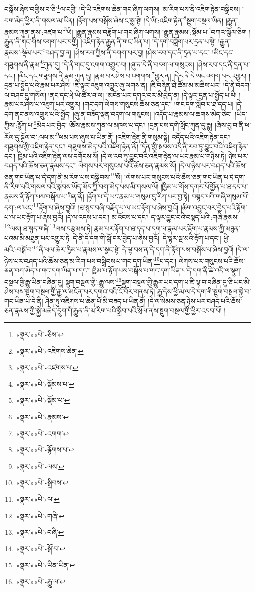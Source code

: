 བསྒོས་ཞེས་བགྱིས་བ་ཅི་\footnote{«སྣར་»«པེ་»ཅིས་}ལ་བགྱི། །དེ་ཡི་འཇིགས་ཆེན་གང་ཞིག་ལགས། །མ་རིག་པས་ནི་འཇིག་རྟེན་བསྒྲིབས། །བག་མེད་ཕྱིར་ནི་གསལ་མ་ཡིན། །རྟོག་པས་བསྒོས་ཞེས་ང་སྨྲ་སྟེ། །དེ་ཡི་:འཇིག་རྟེན་\footnote{«སྣར་»«པེ་»འཇིགས་ཆེན་}སྡུག་བསྔལ་ཡིན། །རྒྱུན་རྣམས་ཀུན་ནས་:འཛག་པ་\footnote{«སྣར་»«པེ་»འཛགས་པ་}ཡི། །རྒྱུན་རྣམས་བཟློག་པ་གང་ཞིག་ལགས། །རྒྱུན་རྣམས་:སྡོམ་པ་\footnote{«སྣར་»«པེ་»སྡོམས་པ་}བཀའ་སྩོལ་ཅིག །རྒྱུན་ནི་གང་གིས་དགག་པར་བགྱི། །འཇིག་རྟེན་རྒྱུན་ནི་གང་ཡིན་པ། །དེ་དག་བཟློག་པར་དྲན་པ་སྟེ། །རྒྱུན་རྣམས་:སྡོམ་པར་\footnote{«སྣར་»«པེ་»སྡོམ་པ་}བཤད་བྱ་ན། །ཤེས་རབ་ཀྱིས་ནི་དགག་པར་བྱ། །ཤེས་རབ་དང་ནི་དྲན་པ་དང་། །མིང་དང་གཟུགས་ནི་རྣམ་\footnote{«སྣར་»«པེ་»རྣམས་}ཀུན་དུ། །དེ་ནི་གང་དུ་འགག་འགྱུར་བ། །ཞུ་ན་དེ་ནི་བདག་ལ་གསུངས། །ཤེས་རབ་དང་ནི་དྲན་པ་དང་། །མིང་དང་གཟུགས་ནི་རྣམ་ཀུན་དུ། །རྣམ་པར་ཤེས་པ་འགགས་\footnote{«སྣར་»«པེ་»འགག་}གྱུར་ན། །དེར་ནི་དེ་ཡང་འགག་པར་འགྱུར། །དྲན་པ་སྤྱོད་པའི་རྣམ་པར་ཤེས། །ཇི་ལྟར་འཇུག་འགྱུར་ཞུ་ལགས་ན། །ཇི་བཞིན་ཐེ་ཚོམ་མ་མཆིས་པར། །དེ་ནི་བདག་ལ་བཤད་དུ་གསོལ། །ནང་དང་ཕྱི་ཡི་ཚོར་བ་ལ། །མངོན་པར་དགའ་བར་མི་བྱེད་ན། །དེ་ལྟར་དྲན་པ་སྤྱོད་པ་ཡི། །རྣམ་པར་ཤེས་པ་འཇུག་པར་འགྱུར། །གང་དག་ལེགས་གསུངས་ཆོས་ཅན་དང་། །གང་དག་སློབ་པ་ཐ་དད་པ། །དེ་དག་ནང་ནས་འགྲུས་པའི་སྤྱོད། །ཞུ་ན་བཟོད་ལྡན་བདག་ལ་གསུངས། །འདོད་པ་རྣམས་ལ་ཆགས་མེད་ཅིང་། །ཡིད་ཀྱིས་:རྙོག་པ་\footnote{«སྣར་»«པེ་»རྙོགས་པ་}མེད་པར་བྱེད། །ཆོས་རྣམས་ཀུན་ལ་མཁས་པ་དང་། །དྲན་པས་དགེ་སློང་ཀུན་དུ་རྒྱུ། །ཞེས་བྱ་བ་ནི་ཕ་རོལ་དུ་སྒྲོལ་བ་:ལས་མ་\footnote{«སྣར་»«པེ་»ལས་}ཕམ་པས་ཞུས་པ་ཡིན་ནོ། །འཇིག་རྟེན་ནི་གསུམ་སྟེ། འདོད་པའི་འཇིག་རྟེན་དང་། གཟུགས་ཀྱི་འཇིག་རྟེན་དང་། གཟུགས་མེད་པའི་འཇིག་རྟེན་ནོ། །དོན་གྱི་སྐབས་འདི་ནི་རབ་ཏུ་བྱུང་བའི་འཇིག་རྟེན་དང་། ཁྱིམ་པའི་འཇིག་རྟེན་ལས་དགོངས་སོ། །དེ་ལ་རབ་ཏུ་བྱུང་བའི་འཇིག་རྟེན་ལ་ཡང་རྣམ་པ་གཉིས་ཏེ། ཉེས་པར་བཤད་པའི་ཆོས་ཅན་རྣམས་དང་། ལེགས་པར་གསུངས་པའི་ཆོས་ཅན་རྣམས་སོ། །དེ་ལ་ཉེས་པར་བཤད་པའི་ཆོས་ཅན་གང་ཡིན་པ་དེ་དག་ནི་མ་རིག་པས་བསྒྲིབས་\footnote{«སྣར་»«པེ་»སྒྲིབས་}སོ། །ལེགས་པར་གསུངས་པའི་ཆོས་ཅན་གང་ཡིན་པ་དེ་དག་ནི་རིག་པའི་གསལ་བའི་སྐབས་ཡོད་མོད་ཀྱི་བག་མེད་པས་མི་གསལ་ལོ། །ཁྱིམ་པ་གོས་དཀར་པོ་གྱོན་པ་ཐ་དད་པ་རྣམས་ནི་རྟོག་པས་བསྒོས་པ་ཡིན་ནོ། །རྟོག་པ་དེ་ཡང་རྣམ་པ་གསུམ་དུ་རིག་པར་བྱ་སྟེ། བསྙད་པའི་གཞི་གསུམ་པོ་དག་:ལ་ཡང་\footnote{«སྣར་»«པེ་»ལ་}རྟོག་པ་ཞེས་བྱའོ། །ཐ་སྙད་བཞི་བརྗོད་པ་ལ་ཡང་རྟོག་པ་ཞེས་བྱའོ། །ཚིག་འབྱུང་བར་བྱེད་པའི་རྟོག་པ་ལ་ཡང་རྟོག་པ་ཞེས་བྱའོ། །དེ་ལ་འདས་པ་དང་། མ་འོངས་པ་དང་། ད་ལྟར་བྱུང་བའི་བསྙད་པའི་:གཞི་རྣམས་\footnote{«སྣར་»«པེ་»གཞི་}ལས། ཐ་སྙད་གཞི་\footnote{«སྣར་»«པེ་»བཞི་}ལས་བརྩམས་ཏེ། རྣམ་པར་རྟོག་པ་ཐ་དད་པ་དག་ལ་རྣམ་པར་རྟོག་པ་རྣམས་ཀྱི་མཐུན་པའམ་མི་མཐུན་པར་འགྱུར་ཏེ། དེ་ནི་དེ་དག་གི་སྒོ་བར་བྱེད་པ་ཞེས་བྱའོ། །དེ་ལྟར་སྔ་མའི་རྟོག་པ་དང་། ཕྱི་མའི་:བསྒོ་བ་\footnote{«སྣར་»«པེ་»སྒོ་བ་}ནི་ཕལ་ཆེར་ཁྱིམ་པ་རྣམས་ལ་སྣང་སྟེ། དེ་ལྟ་བས་ན་དེ་དག་ནི་རྟོག་པས་བསྒོས་པ་ཞེས་བྱའོ། །དེ་ལ་ཉེས་པར་བཤད་པའི་ཆོས་ཅན་མ་རིག་པས་བསྒྲིབས་པ་གང་དག་ཡིན་\footnote{«སྣར་»«པེ་»ཡིན་ཡིན་}པ་དང་། ལེགས་པར་གསུངས་པའི་ཆོས་ཅན་བག་མེད་པ་གང་དག་ཡིན་པ་དང་། ཁྱིམ་པ་རྟོག་པས་བསྒོས་པ་གང་དག་ཡིན་པ་དེ་དག་ནི་ཚེ་འདི་ལ་སྡུག་བསྔལ་གྱི་རྒྱུ་ཡིན་བཞིན་དུ། སྡུག་བསྔལ་གྱི་:རྒྱུ་ལས་\footnote{«སྣར་»«པེ་»རྒྱུ་ལ་}སྡུག་བསྔལ་གྱི་རྒྱུར་ཡང་དག་པ་ཇི་ལྟ་བ་བཞིན་དུ་ཅི་ཡང་མི་ཤེས་པས་སྡུག་བསྔལ་གྱི་རྒྱུ་ལ་མངོན་པར་དགའ་བའི་ངོ་བོར་གནས་ཏེ། རྒྱུ་དེས་ཕྱི་མ་ལ་དེ་དག་གི་སྡུག་བསྔལ་སྐྱེ་བ་གང་ཡིན་པ་དེ་ནི། ཤིན་ཏུ་འཇིགས་པ་ཆེན་པོ་མི་བཟད་པ་ཡིན་ནོ། །དེ་ལ་སེམས་ཅན་ཉེས་པར་བཤད་པའི་ཆོས་ཅན་རྣམས་ཀྱི་སྐྱེ་མཆེད་དྲུག་གི་རྒྱུན་ནི་མ་རིག་པའི་སྒྲིབ་པའི་སྲོལ་ནས་སྡུག་བསྔལ་གྱི་ཕྱིར་འབབ་པོ། །
